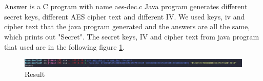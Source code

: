 \documentclass{article}
\begin{document}
    \section{}
    Answer is a C program with name aes-dec.c
    Java program generates different secret keys, different AES cipher text and different IV. 
    We used keys, iv and cipher text that the java program generated and the answers are all the same, 
    which prints out "Secret". The secret keys, IV and cipher text from java program that used are in the following figure \ref{fig:result}.
    \begin{figure}
        \includegraphics[width=\linewidth]{proof.jpg}
        \caption{Result}
        \label{fig:result}
    \end{figure}
        \newpage
        \printbibliography
\end{document}
